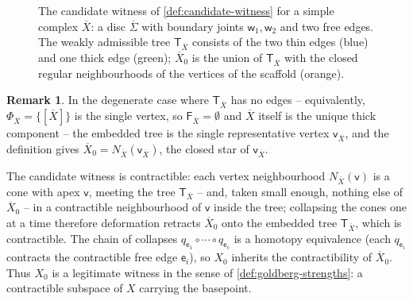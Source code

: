 \documentclass[reqno]{amsart}
\theoremstyle{definition}
\newtheorem{remark}[theorem]{Remark}
\newcommand\sfT{\mathsf{T}}
\newcommand\sfe{\mathsf{e}}
\newcommand\sfv{\mathsf{v}}
\newcommand\sfw{\mathsf{w}}
\renewcommand{\bar}{\overline}
\numberwithin{equation}{section}
\begin{document}
\begin{figure}[ht]
\centering
{}
\caption{The candidate witness of
\cref{def:candidate-witness} for a simple complex \(\bar X\):
a disc \(\bar\Sigma\) with boundary joints \(\sfw_1,\sfw_2\)
and two free edges. The weakly admissible tree \(\sfT_{\bar X}\)
consists of the two thin edges (blue) and one thick edge
(green); \(\bar X_0\) is the union of \(\sfT_{\bar X}\) with the
closed regular neighbourhoods of the vertices of the scaffold
(orange).}
\label{fig:candidate-witness}
\end{figure}

\begin{remark}\label{rem:vSigma-redundant}
In the degenerate case where \(\sfT_{\bar X}\) has no edges --
equivalently, \(\Phi_{\bar X}=\{[\bar X]\}\) is the single vertex,
so \(\mathsf{F}_{\bar X}=\emptyset\) and \(\bar X\) itself is the
unique thick component -- the embedded tree is the single
representative vertex \(\sfv_{\bar X}\), and the definition gives
\(\bar X_0=N_{\bar X}(\sfv_{\bar X})\), the closed star of
\(\sfv_{\bar X}\).
\end{remark}

The candidate witness is contractible: each vertex
neighbourhood \(N_{\bar X}(\sfv)\) is a cone with apex \(\sfv\),
meeting the tree \(\sfT_{\bar X}\) -- and, taken small enough,
nothing else of \(\bar X_0\) -- in a contractible neighbourhood
of \(\sfv\) inside the tree; collapsing the cones one at a time
therefore deformation retracts \(\bar X_0\) onto the embedded
tree \(\sfT_{\bar X}\), which is contractible. The chain of collapses
\(q_{\sfe_1}\circ\cdots\circ q_{\sfe_c}\) is a homotopy equivalence
(each \(q_{\sfe_i}\) contracts the contractible free edge \(\sfe_i\)), so
\(X_0\) inherits the contractibility of \(\bar X_0\). Thus \(X_0\) is
a legitimate witness in the sense of
\cref{def:goldberg-strengths}: a contractible subspace
of \(X\) carrying the basepoint.
\end{document}
